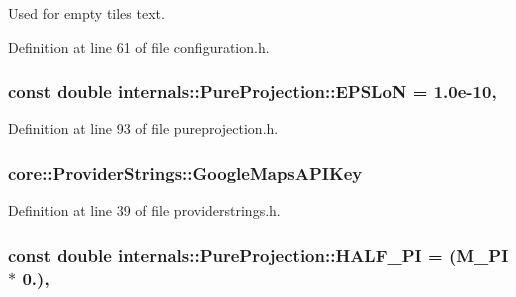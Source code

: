Used for empty tiles text. 



Definition at line 61 of file configuration.\-h.

\hypertarget{group___o_p_map_widget_ga48583ac82eb87f081f2dc32a9ab39349}{
\subsubsection[{E\-P\-S\-Lo\-N}]{\setlength{\rightskip}{0pt plus 5cm}const {\bf double} internals\-::\-Pure\-Projection\-::\-E\-P\-S\-Lo\-N = 1.\-0e-\/10\hspace{0.3cm}{\ttfamily [static]}, {\ttfamily [protected]}}}\label{group___o_p_map_widget_ga48583ac82eb87f081f2dc32a9ab39349}


Definition at line 93 of file pureprojection.\-h.

\hypertarget{group___o_p_map_widget_ga4a655ecac5457e2a580ee2c9b7743441}{
\subsubsection[{Google\-Maps\-A\-P\-I\-Key}]{ core\-::\-Provider\-Strings\-::\-Google\-Maps\-A\-P\-I\-Key}}\label{group___o_p_map_widget_ga4a655ecac5457e2a580ee2c9b7743441}


Definition at line 39 of file providerstrings.\-h.

\hypertarget{group___o_p_map_widget_ga767800d1664d3a7d0255a1d1d55bea69}{
\subsubsection[{H\-A\-L\-F\-\_\-\-P\-I}]{\setlength{\rightskip}{0pt plus 5cm}const {\bf double} internals\-::\-Pure\-Projection\-::\-H\-A\-L\-F\-\_\-\-P\-I = (M\-\_\-\-P\-I $\ast$ 0.)\hspace{0.3cm}{\ttfamily [static]}, {\ttfamily [protected]}}}\label{group___o_p_map_widget_ga767800d1664d3a7d0255a1d1d55bea69}


